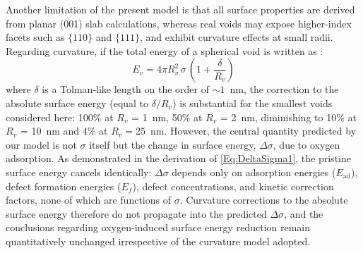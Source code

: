 \documentclass[preprint,12pt,sort&compress]{elsarticle}
\newcommand{\?}{\stackrel{?}{=}}
\begin{document}
Another limitation of the present model is that all surface properties are derived from planar (001) slab calculations, whereas real voids may expose higher-index facets such as $\{110\}$ and $\{111\}$, and exhibit curvature effects at small radii. Regarding curvature, if the total energy of a spherical void is written as \cite{Tolman1949,Chhapadia2011,Wang2021}:
\begin{equation}
E_v = 4 \pi R_v^2 \, \sigma \, \left(1 + \frac{\delta}{R_v} \right)    
\end{equation}
where $\delta$ is a Tolman-like length on the order of $\sim 1$~nm, the correction to the absolute surface energy (equal to $\delta/R_v$) is substantial for the smallest voids considered here: 100\% at $R_v$ = 1~nm, 50\% at $R_v$ = 2~nm, diminishing to 10\% at $R_v$ = 10~nm and 4\% at $R_v = 25$~nm. However, the central quantity predicted by our model is not $\sigma$ itself but the change in surface energy, $\Delta\sigma$, due to oxygen adsorption. As demonstrated in the derivation of \cref{Eq:DeltaSigma1}, the pristine surface energy cancels identically: $\Delta\sigma$ depends only on adsorption energies ($E_\mathrm{ad}$), defect formation energies ($E_f$), defect concentrations, and kinetic correction factors, none of which are functions of $\sigma$. Curvature corrections to the absolute surface energy therefore do not propagate into the predicted $\Delta\sigma$, and the conclusions regarding oxygen-induced surface energy reduction remain quantitatively unchanged irrespective of the curvature model adopted.
\end{document}
